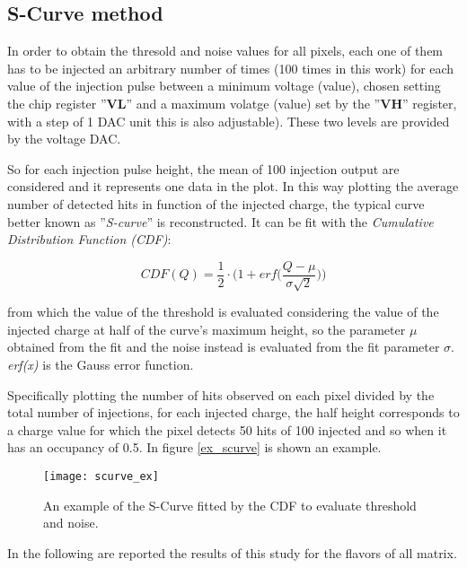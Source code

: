 \subsection{S-Curve method} \label{threshold_subsection}

In order to obtain the thresold and noise values for all pixels, each one of them has to be injected an arbitrary number of times (100 times in this work) for each value of the injection pulse between a minimum voltage (value), chosen setting the chip register ''\textbf{VL}'' and a maximum volatge (value) set by the ''\textbf{VH}'' register, with a step of 1 DAC unit this is also adjustable). These two levels are provided by the voltage DAC.

So for each injection pulse height, the mean of 100 injection output are considered and it represents one data in the plot.  In this way plotting the average number of detected hits in function of the injected charge, the typical curve better known as ''\textit{S-curve}'' is reconstructed. It can be fit with the \textit{Cumulative Distribution Function (CDF)}:

\begin{equation}
 CDF(Q) = \frac{1}{2} \cdot \bigg(1 + \textit{erf}\bigg(\frac{Q-\mu}{\sigma \sqrt{2}}\bigg)\bigg)
\end{equation}

from which the value of the threshold is evaluated considering the value of the injected charge at half of the curve's maximum height, so the parameter $\mu$ obtained from the fit and the noise instead is evaluated from the fit parameter $\sigma$. \textit{erf(x)} is the Gauss error function. 

Specifically plotting the number of hits observed on each pixel divided by the total number of injections, for each injected charge, the half height corresponds to a charge value for which the pixel detects 50 hits of 100 injected and so when it has an occupancy of 0.5. In figure \vref{ex_scurve} is shown an example.



\begin{figure}
\centering
\texttt{[image: scurve\_ex]}
\caption{An example of the S-Curve fitted by the CDF to evaluate threshold and noise.}
\label{ex_scurve}
\end{figure}

In the following are reported the results of this study for the flavors of all matrix.


